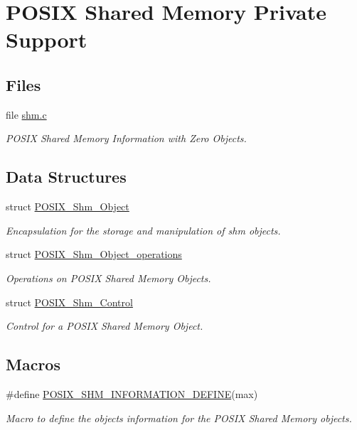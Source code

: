 \hypertarget{group__POSIXShmPrivate}{}\section{P\+O\+S\+IX Shared Memory Private Support}
\label{group__POSIXShmPrivate}
\subsection*{Files}
\begin{DoxyCompactItemize}
\item 
file \mbox{\hyperlink{shm_8c}{shm.\+c}}
\begin{DoxyCompactList}\small\item\em P\+O\+S\+IX Shared Memory Information with Zero Objects. \end{DoxyCompactList}\end{DoxyCompactItemize}
\subsection*{Data Structures}
\begin{DoxyCompactItemize}
\item 
struct \mbox{\hyperlink{structPOSIX__Shm__Object}{P\+O\+S\+I\+X\+\_\+\+Shm\+\_\+\+Object}}
\begin{DoxyCompactList}\small\item\em Encapsulation for the storage and manipulation of shm objects. \end{DoxyCompactList}\item 
struct \mbox{\hyperlink{structPOSIX__Shm__Object__operations}{P\+O\+S\+I\+X\+\_\+\+Shm\+\_\+\+Object\+\_\+operations}}
\begin{DoxyCompactList}\small\item\em Operations on P\+O\+S\+IX Shared Memory Objects. \end{DoxyCompactList}\item 
struct \mbox{\hyperlink{structPOSIX__Shm__Control}{P\+O\+S\+I\+X\+\_\+\+Shm\+\_\+\+Control}}
\begin{DoxyCompactList}\small\item\em Control for a P\+O\+S\+IX Shared Memory Object. \end{DoxyCompactList}\end{DoxyCompactItemize}
\subsection*{Macros}
\begin{DoxyCompactItemize}
\item 
\#define \mbox{\hyperlink{group__POSIXShmPrivate_ga608e0abdf7752a11280e244780aeefc2}{P\+O\+S\+I\+X\+\_\+\+S\+H\+M\+\_\+\+I\+N\+F\+O\+R\+M\+A\+T\+I\+O\+N\+\_\+\+D\+E\+F\+I\+NE}}(max)
\begin{DoxyCompactList}\small\item\em Macro to define the objects information for the P\+O\+S\+IX Shared Memory objects. \end{DoxyCompactList}\end{DoxyCompactItemize}
